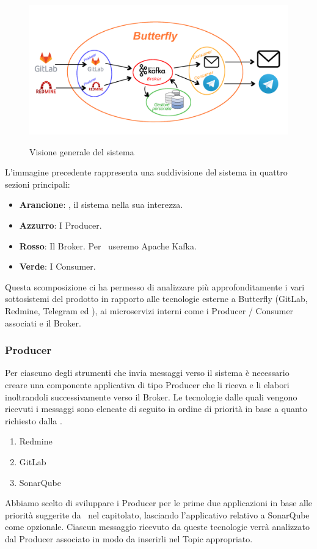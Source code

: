 	\begin{figure}[H]
		\centering
		\includegraphics[width=\textwidth]{img/butterfly.png}\\
		\caption{Visione generale del sistema \progetto}
		\label{fig:butterfly}
	\end{figure}
\newpage
	L'immagine precedente rappresenta una suddivisione del sistema in quattro sezioni principali:
	\begin{itemize}
		\item \textbf{Arancione}: \progetto, il sistema nella sua interezza.
		\item \textbf{Azzurro}: I Producer.
		\item \textbf{Rosso}: Il Broker. Per \progetto\ useremo Apache Kafka.
		\item \textbf{Verde}: I Consumer.
	\end{itemize}
	Questa scomposizione ci ha permesso di analizzare più approfonditamente i vari sottosistemi del prodotto in rapporto alle tecnologie esterne a Butterfly (GitLab, Redmine, Telegram ed \mail), ai microservizi interni come i Producer / Consumer associati e il Broker.

	\subsubsection{Producer}\label{TecnologieProducer}
	
		Per ciascuno degli strumenti che invia messaggi verso il sistema è necessario creare una componente applicativa di tipo Producer che li riceva e li elabori inoltrandoli successivamente verso il Broker.
		Le tecnologie dalle quali vengono ricevuti i messaggi sono elencate di seguito in ordine di priorità in base a quanto richiesto dalla .
		\begin{enumerate}
			\item Redmine
			\item GitLab
			\item SonarQube
		\end{enumerate}
		Abbiamo scelto di sviluppare i Producer per le prime due applicazioni in base alle priorità suggerite da \II\ nel capitolato, lasciando l'applicativo relativo a SonarQube come opzionale.
		Ciascun messaggio ricevuto da queste tecnologie verrà analizzato dal Producer associato in modo da inserirli nel Topic appropriato.


